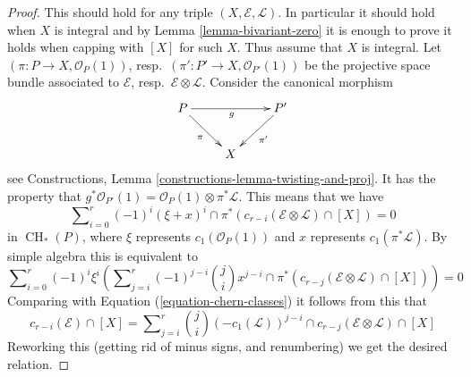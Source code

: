 \documentclass[10pt,a4paper]{amsart}
\theoremstyle{plain}
\theoremstyle{definition}
\theoremstyle{remark}
\numberwithin{equation}{subsection}
\def\CH{\mathop{\mathrm{CH}}\nolimits}
\begin{document}
\begin{proof}
This should hold for any triple $(X, \mathcal{E}, \mathcal{L})$.
In particular it should hold when $X$ is integral and by
Lemma \ref{lemma-bivariant-zero}
it is enough to prove
it holds when capping with $[X]$ for such $X$. Thus assume
that $X$ is integral. Let $(\pi : P \to X, \mathcal{O}_P(1))$,
resp.\ $(\pi' : P' \to X, \mathcal{O}_{P'}(1))$ be the
projective space bundle associated to $\mathcal{E}$,
resp.\ $\mathcal{E} \otimes \mathcal{L}$. Consider the canonical morphism
$$
\xymatrix{
P \ar[rd]_\pi \ar[rr]_g & & P' \ar[ld]^{\pi'} \\
& X &
}
$$
see Constructions, Lemma \ref{constructions-lemma-twisting-and-proj}.
It has the property that
$g^*\mathcal{O}_{P'}(1)
= \mathcal{O}_P(1) \otimes \pi^* {\mathcal L}$.
This means that we have
$$
\sum\nolimits_{i = 0}^r
(-1)^i
(\xi + x)^i \cap \pi^*(c_{r - i}(\mathcal{E} \otimes \mathcal{L}) \cap [X])
=
0
$$
in $\CH_*(P)$, where $\xi$ represents
$c_1(\mathcal{O}_P(1))$ and $x$
represents $c_1(\pi^*\mathcal{L})$. By simple algebra this
is equivalent to
$$
\sum\nolimits_{i = 0}^r
(-1)^i \xi^i \left(
\sum\nolimits_{j = i}^r
(-1)^{j - i}
\binom{j}{i}
x^{j - i} \cap
\pi^*(c_{r - j}(\mathcal{E} \otimes \mathcal{L}) \cap [X])
\right)
=
0
$$
Comparing with
Equation (\ref{equation-chern-classes}) it follows from this that
$$
c_{r - i}(\mathcal{E}) \cap [X] =
\sum\nolimits_{j = i}^r
\binom{j}{i}
(-c_1(\mathcal{L}))^{j - i} \cap
c_{r - j}(\mathcal{E} \otimes \mathcal{L}) \cap [X]
$$
Reworking this (getting rid of minus signs, and renumbering) we get
the desired relation.
\end{proof}
\end{document}
